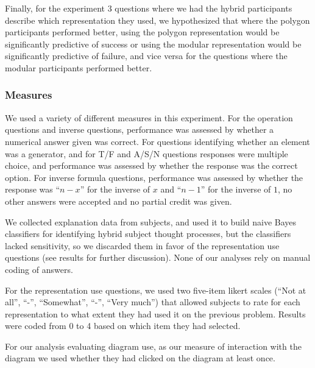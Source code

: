 \documentclass[man,mask,10pt]{apa6}
\begin{document}
Finally, for the experiment 3 questions where we had the hybrid participants describe which representation they used, we hypothesized that where the polygon participants performed better, using the polygon representation would be significantly predictive of success or using the modular representation would be significantly predictive of failure, and vice versa for the questions where the modular participants performed better.
\subsubsection{Measures}
We used a variety of different measures in this experiment. For the operation questions and inverse questions, performance was assessed by whether a numerical answer given was correct. For questions identifying whether an element was a generator, and for T/F and A/S/N questions responses were multiple choice, and performance was assessed by whether the response was the correct option. For inverse formula questions, performance was assessed by whether the response was ``$n-x$'' for the inverse of $x$ and ``$n-1$'' for the inverse of $1$, no other answers were accepted and no partial credit was given.\par
We collected explanation data from subjects, and used it to build naive Bayes classifiers for identifying hybrid subject thought processes, but the classifiers lacked sensitivity, so we discarded them in favor of the representation use questions (see results for further discussion). None of our analyses rely on manual coding of answers. \par
For the representation use questions, we used two five-item likert scales (``Not at all'', ``-'', ``Somewhat'', ``-'', ``Very much'') that allowed subjects to rate for each representation to what extent they had used it on the previous problem. Results were coded from 0 to 4 based on which item they had selected. \par
For our analysis evaluating diagram use, as our measure of interaction with the diagram we used whether they had clicked on the diagram at least once. 
\end{document}
